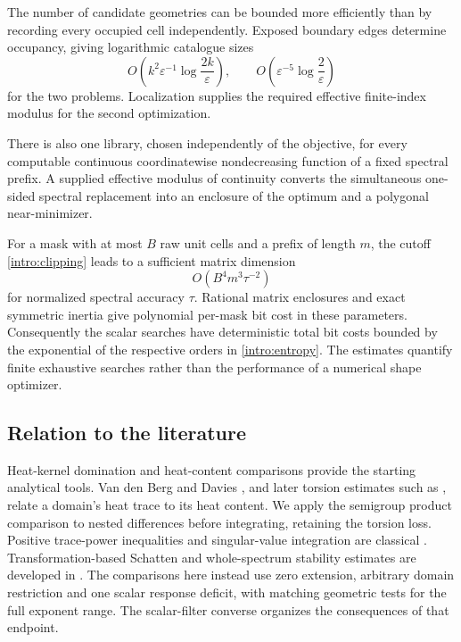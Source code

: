 \documentclass[11pt,reqno]{amsart}
\numberwithin{equation}{section}
\begin{document}
The number of candidate geometries can be bounded more efficiently
than by recording every occupied cell independently. Exposed
boundary edges determine occupancy, giving logarithmic catalogue
sizes
\begin{equation}\label{intro:entropy}
 O\!\left(k^2\varepsilon^{-1}\log\frac{2k}{\varepsilon}\right),
 \qquad
 O\!\left(\varepsilon^{-5}\log\frac2\varepsilon\right)
\end{equation}
for the two problems. Localization supplies the required effective
finite-index modulus for the second optimization.

There is also one library, chosen independently of the objective,
for every computable continuous coordinatewise nondecreasing
function of a fixed spectral prefix. A supplied effective modulus
of continuity converts the simultaneous one-sided spectral
replacement into an enclosure of the optimum and a polygonal
near-minimizer.

For a mask with at most \(B\) raw unit cells and a prefix of length
\(m\), the cutoff \eqref{intro:clipping} leads to a sufficient
matrix dimension
\begin{equation}\label{intro:matrix-dimension}
 O(B^4m^3\tau^{-2})
\end{equation}
for normalized spectral accuracy \(\tau\). Rational matrix
enclosures and exact symmetric inertia give polynomial per-mask
bit cost in these parameters. Consequently the scalar searches
have deterministic total bit costs bounded by the exponential of the
respective orders in \eqref{intro:entropy}. The estimates quantify
finite exhaustive searches rather than the performance of a
numerical shape optimizer.

\subsection*{Relation to the literature}

Heat-kernel domination and heat-content comparisons provide the
starting analytical tools. Van den Berg and Davies
\cite{vanDenBergDavies1989}, and later torsion estimates such as
\cite{vanDenBerg2012}, relate a domain's heat trace to its heat
content. We apply the semigroup product comparison to nested
differences before integrating, retaining the torsion loss.
Positive trace-power inequalities and singular-value integration
are classical \cite{FackKosaki1986}. Transformation-based
Schatten and whole-spectrum stability estimates are developed in
\cite{BarbatisBurenkovLamberti2010,BarbatisLamberti2012}.
The comparisons here instead use zero extension, arbitrary domain
restriction and one scalar response deficit, with matching
geometric tests for the full exponent range. The scalar-filter
converse organizes the consequences of that endpoint.
\end{document}
